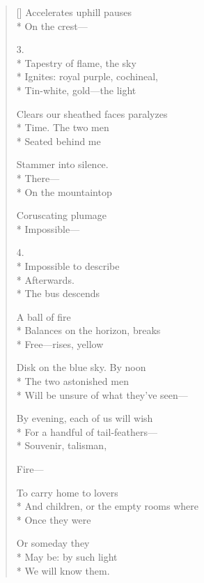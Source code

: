\begin{verse}[\versewidth]
Accelerates        uphill             pauses\\*
On the crest---

3.\\*
Tapestry of flame, the sky\\*
Ignites: royal purple, cochineal,\\*
Tin-white, gold---the light

Clears our sheathed faces       paralyzes\\*
Time.         The two men\\*
Seated behind me

Stammer into silence.\\*
                                         There---\\*
On the mountaintop

Coruscating plumage\\*
Impossible---

4.\\*
Impossible to describe\\*
Afterwards.\\*
                             The bus descends

A ball of fire\\*
Balances on the horizon, breaks\\*
Free---rises, yellow

Disk on the blue sky.            By noon\\*
The two astonished men\\*
Will be unsure of what they've seen---

By evening, each of us will wish\\*
For a handful of tail-feathers---\\*
Souvenir, talisman,

Fire---

To carry home to lovers\\*
And children, or the empty rooms where\\*
Once they were

Or someday they\\*
May be: by such light\\*
We will know them.
\end{verse}
